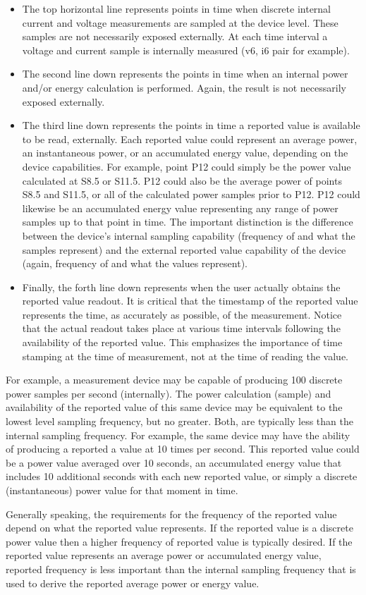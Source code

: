 \begin{itemize}
\begin{itemize}
\item
The top horizontal line represents points in time when discrete internal current and voltage measurements are sampled at the device level. These samples are not necessarily exposed externally. At each time interval a voltage and current sample is internally measured (v6, i6 pair for example).  
\item
The second line down represents the points in time when an internal power and/or energy calculation is performed. Again, the result is not necessarily exposed externally.
\item
The third line down represents the points in time a reported value is available to be read, externally. Each reported value could represent an average power, an instantaneous power, or an accumulated energy value, depending on the device capabilities. For example, point P12 could simply be the power value calculated at S8.5 or S11.5. P12 could also be the average power of points S8.5 and S11.5, or all of the calculated power samples prior to P12. P12 could likewise be an accumulated energy value representing any range of power samples up to that point in time. The important distinction is the difference between the device’s internal sampling capability (frequency of and what the samples represent) and the external reported value capability of the device (again, frequency of and what the values represent).
\item
Finally, the forth line down represents when the user actually obtains the reported value readout. It is critical that the timestamp of the reported value represents the time, as accurately as possible, of the measurement. Notice that the actual readout takes place at various time intervals following the availability of the reported value. This emphasizes the importance of time stamping at the time of measurement, not at the time of reading the value.
\end{itemize}

For example, a measurement device may be capable of producing 100 discrete power samples per second (internally). The power calculation (sample) and availability of the reported value of this same device may be equivalent to the lowest level sampling frequency, but no greater. Both, are typically less than the internal sampling frequency. For example, the same device may have the ability of producing a reported a value at 10 times per second. This reported value could be a power value averaged over 10 seconds, an accumulated energy value that includes 10 additional seconds with each new reported value, or simply a discrete (instantaneous) power value for that moment in time. 

Generally speaking, the requirements for the frequency of the reported value depend on what the reported value represents. If the reported value is a discrete power value then a higher frequency of reported value is typically desired. If the reported value represents an average power or accumulated energy value, reported frequency is less important than the internal sampling frequency that is used to derive the reported average power or energy value.
\end{itemize}


